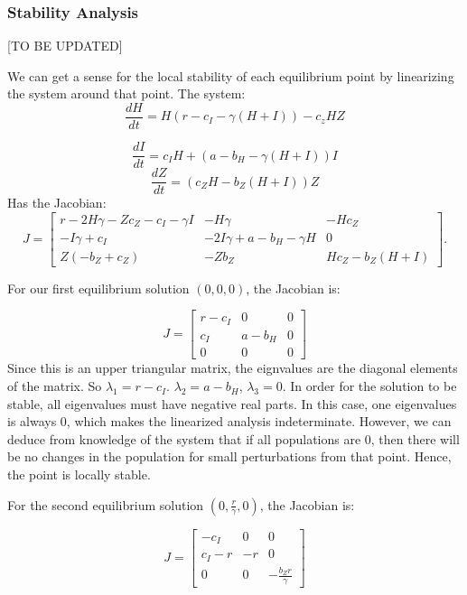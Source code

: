 \documentclass[
	12pt
]{article}
\begin{document}
\subsubsection{Stability Analysis}
[TO BE UPDATED]

We can get a sense for the local stability of each equilibrium point by linearizing the system around that point. The system:
\begin{equation}
\frac{dH}{dt} = H(r - c_I-\gamma(H+I))-c_zHZ
\end{equation}

\begin{equation}
\frac{dI}{dt} = c_IH+(a-b_H-\gamma(H+I))I
\end{equation}
\begin{equation}
\frac{dZ}{dt} = (c_ZH-b_Z(H+I))Z
\end{equation}
Has the Jacobian:
\begin{equation}
J = \begin{bmatrix}
r-2H\gamma - Zc_Z - c_I - \gamma I & -H\gamma & -Hc_Z \\
-I\gamma + c_I & -2I\gamma + a - b_H - \gamma H & 0 \\
 Z(-b_Z + c_Z) & -Zb_Z & Hc_Z - b_Z(H + I)
\end{bmatrix}.
\end{equation}

For our first equilibrium solution $(0, 0, 0)$, the Jacobian is:

\begin{equation}
J=\begin{bmatrix} r-c_I& 0 & 0 \\ c_I & a - b_H & 0 \\ 0 & 0 & 0 \end{bmatrix}
\end{equation}
Since this is an upper triangular matrix, the eignvalues are the diagonal elements of the matrix. So $\lambda_1=r-c_I$. $\lambda_2=a-b_H$, $\lambda_3=0$. In order for the solution to be stable, all eigenvalues must have negative real parts. In this case, one eigenvalues is always $0$, which makes the linearized analysis indeterminate. However, we can deduce from knowledge of the system that if all populations are $0$, then there will be no changes in the population for small perturbations from that point. Hence, the point is locally stable.

For the second equilibrium solution $(0,\frac{r}{\gamma},0)$, the Jacobian is:

\begin{equation}
J=\begin{bmatrix} -c_I & 0 & 0 \\ c_I - r & -r & 0 \\ 0 & 0 & -\frac{b_Z r}{\gamma} \end{bmatrix}
\end{equation}
\end{document}
